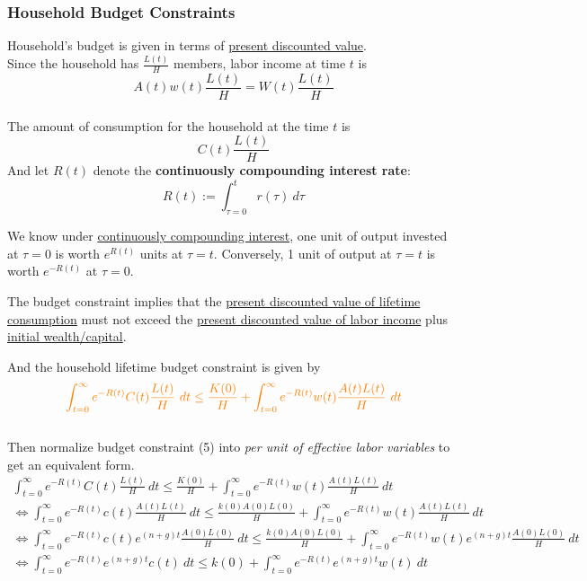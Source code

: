 \documentclass[]{article}
\begin{document}
	\subsubsection{Household Budget Constraints}
	\par Household's budget is given in terms of \ul{present discounted value}. \\
	Since the household has $\frac{L(t)}{H}$ members, labor income at time $t$ is 
	\[
		A(t)w(t)\frac{L(t)}{H} = W(t)\frac{L(t)}{H}
	\]
	\\
	The amount of consumption for the household at the time $t$ is 
	\[
		C(t)\frac{L(t)}{H}
	\]
	And let $R(t)$ denote the \textbf{continuously compounding interest rate}:
	\begin{equation}
		R(t) := \int_{\tau=0}^t r(\tau)\ d\tau
	\end{equation}
	\begin{remark}
		We know under \ul{continuously compounding interest}, one unit of output invested at $\tau=0$ is worth $e^{R(t)}$ units at $\tau=t$. Conversely, 1 unit of output at $\tau=t$ is worth $e^{-R(t)}$ at $\tau=0$.
	\end{remark}
	\begin{remark}
		The budget constraint implies that the \ul{present discounted value of lifetime consumption} must not exceed the \ul{present discounted value of labor income} plus \ul{initial wealth/capital}.
	\end{remark}
	\par And the household lifetime budget constraint is given by
	\begin{equation}
		\textcolor{orange}{
			\int_{t=0}^\infty e^{-R(t)} C(t) \frac{L(t)}{H}\ dt \leq \frac{K(0)}{H} + \int_{t=0}^\infty e^{-R(t)} w(t) \frac{A(t)L(t)}{H}\ dt
		}
	\end{equation}
	\\
	Then normalize budget constraint (5) into \emph{per unit of effective labor variables} to get an equivalent form.
	\begin{gather*}
		\int_{t=0}^\infty e^{-R(t)} C(t) \frac{L(t)}{H}\ dt  \leq \frac{K(0)}{H} + \int_{t=0}^\infty e^{-R(t)} w(t) \frac{A(t)L(t)}{H}\ dt \\
		\iff 
		\int_{t=0}^\infty e^{-R(t)} c(t) \frac{A(t)L(t)}{H}\ dt \leq \frac{k(0)A(0)L(0)}{H} + \int_{t=0}^\infty e^{-R(t)} w(t) \frac{A(t)L(t)}{H}\ dt \\ 
		\iff \int_{t=0}^\infty e^{-R(t)} c(t) e^{(n+g)t} \frac{A(0)L(0)}{H}\ dt \leq \frac{k(0)A(0)L(0)}{H} + \int_{t=0}^\infty e^{-R(t)} w(t) e^{(n+g)t}\frac{A(0)L(0)}{H}\ dt \\
		\iff \int_{t=0}^\infty e^{-R(t)} e^{(n+g)t} c(t)\ dt \leq k(0) + \int_{t=0}^\infty e^{-R(t)} e^{(n+g)t} w(t)\ dt
	\end{gather*}
\end{document}
